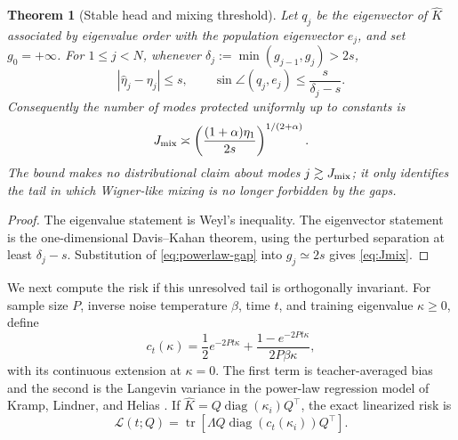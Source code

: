 \documentclass{article}
\newtheorem{theorem}{Theorem}[section]
\newcommand{\tr}{\operatorname{tr}}
\newcommand{\diag}{\operatorname{diag}}
\newcommand{\wh}{\widehat}
\begin{document}
\begin{theorem}[Stable head and mixing threshold]
\label{thm:stable-head}
Let \(q_j\) be the eigenvector of \(\wh K\) associated by eigenvalue order with the population eigenvector \(e_j\), and set \(g_0=+\infty\).  For \(1\le j<N\), whenever
\(\delta_j:=\min(g_{j-1},g_j)>2s\),
\begin{equation}
|\wh\eta_j-\eta_j|\le s,
\qquad
\sin\angle(q_j,e_j)\le \frac{s}{\delta_j-s}.
\label{eq:davis-kahan-head}
\end{equation}
Consequently the number of modes protected uniformly up to constants is
\begin{equation}
J_{\rm mix}
\asymp
\left(\frac{(1+\alpha)\eta_1}{2s}\right)^{1/(2+\alpha)}.
\label{eq:Jmix}
\end{equation}
The bound makes no distributional claim about modes \(j\gtrsim J_{\rm mix}\); it only identifies the tail in which Wigner-like mixing is no longer forbidden by the gaps.
\end{theorem}

\begin{proof}
The eigenvalue statement is Weyl's inequality.  The eigenvector statement is the one-dimensional Davis--Kahan theorem, using the perturbed separation at least \(\delta_j-s\).  Substitution of \eqref{eq:powerlaw-gap} into \(g_j\simeq2s\) gives \eqref{eq:Jmix}.
\end{proof}

We next compute the risk if this unresolved tail is orthogonally invariant.  For sample size \(P\), inverse noise temperature \(\beta\), time \(t\), and training eigenvalue \(\kappa\ge0\), define
\begin{equation}
c_t(\kappa)=\frac12e^{-2Pt\kappa}
+\frac{1-e^{-2Pt\kappa}}{2P\beta\kappa},
\label{eq:spectral-cost}
\end{equation}
with its continuous extension at \(\kappa=0\).  The first term is teacher-averaged bias and the second is the Langevin variance in the power-law regression model of Kramp, Lindner, and Helias \citep{KrampLindnerHelias2026}.  If
\(\wh K=Q\diag(\kappa_i)Q^\top\), the exact linearized risk is
\begin{equation}
\mathcal L(t;Q)=\tr\!\left[\Lambda Q\diag(c_t(\kappa_i))Q^\top\right].
\label{eq:exact-linear-risk}
\end{equation}
\end{document}
